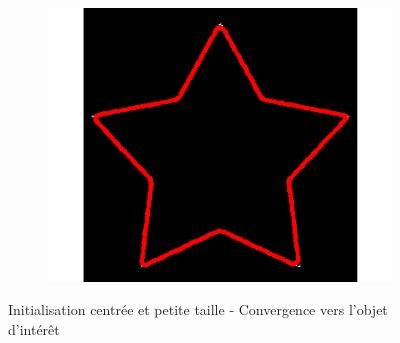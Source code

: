 \begin{figure}[H]
\begin{subfigure}[c]{0.3\linewidth}
\includegraphics[width=\textwidth]{Chapters/Images/Init/vfccs3}
\caption{}
\end{subfigure}
\caption{Initialisation centrée et petite taille - Convergence vers l'objet d'intérêt}
\end{figure}

